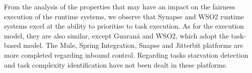 From the analysis of the properties that may have an impact on the fairness execution of the runtime systems, we observe that Synapse and WSO2 runtime systems excel at the ability to prioritise to task execution. As for the execution model, they are also similar, except Guaraná and WSO2, which adopt the task-based model. The Mule, Spring Integration, Snapse and Jitterbit platforms are more completed regarding inbound control. Regarding tasks starvation detection and task complexity identification have not been dealt in these platforms.
